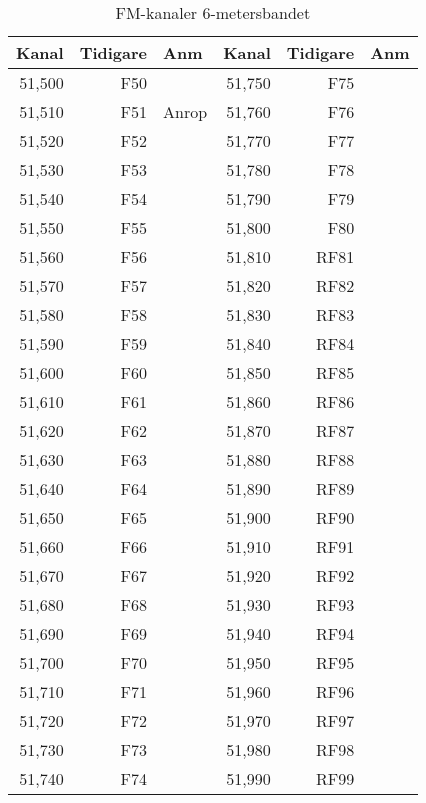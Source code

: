 \begin{longtable}{rrl|rrl}
\caption{FM-kanaler 6-metersbandet}\\
\textbf{Kanal} & \textbf{Tidigare} & \textbf{Anm}
&  \textbf{Kanal} & \textbf{Tidigare} & \textbf{Anm} \\ \hline
	51,500 &      F50 &       & 51,750 &      F75 &  \\
	51,510 &      F51 & Anrop & 51,760 &      F76 &  \\
	51,520 &      F52 &       & 51,770 &      F77 &  \\
	51,530 &      F53 &       & 51,780 &      F78 &  \\
	51,540 &      F54 &       & 51,790 &      F79 &  \\
	51,550 &      F55 &       & 51,800 &      F80 &  \\
	51,560 &      F56 &       & 51,810 &     RF81 &  \\
	51,570 &      F57 &       & 51,820 &     RF82 &  \\
	51,580 &      F58 &       & 51,830 &     RF83 &  \\
	51,590 &      F59 &       & 51,840 &     RF84 &  \\
	51,600 &      F60 &       & 51,850 &     RF85 &  \\
	51,610 &      F61 &       & 51,860 &     RF86 &  \\
	51,620 &      F62 &       & 51,870 &     RF87 &  \\
	51,630 &      F63 &       & 51,880 &     RF88 &  \\
	51,640 &      F64 &       & 51,890 &     RF89 &  \\
	51,650 &      F65 &       & 51,900 &     RF90 &  \\
	51,660 &      F66 &       & 51,910 &     RF91 &  \\
	51,670 &      F67 &       & 51,920 &     RF92 &  \\
	51,680 &      F68 &       & 51,930 &     RF93 &  \\
	51,690 &      F69 &       & 51,940 &     RF94 &  \\
	51,700 &      F70 &       & 51,950 &     RF95 &  \\
	51,710 &      F71 &       & 51,960 &     RF96 &  \\
	51,720 &      F72 &       & 51,970 &     RF97 &  \\
	51,730 &      F73 &       & 51,980 &     RF98 &  \\
	51,740 &      F74 &       & 51,990 &     RF99 &
\end{longtable}

